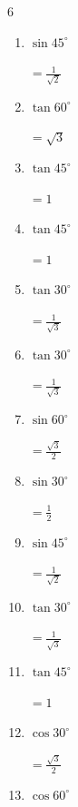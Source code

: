 \begin{multicols}{6}
\begin{enumerate}
        $\displaystyle =\frac{1}{\sqrt{3}}$

  \item $\displaystyle \sin{45^\circ}$

        $\displaystyle =\frac{1}{\sqrt{2}}$

  \item $\displaystyle \tan{60^\circ}$

        $\displaystyle =\sqrt{3}$

  \item $\displaystyle \tan{45^\circ}$

        $\displaystyle =1$

  \item $\displaystyle \tan{45^\circ}$

        $\displaystyle =1$

  \item $\displaystyle \tan{30^\circ}$

        $\displaystyle =\frac{1}{\sqrt{3}}$

  \item $\displaystyle \tan{30^\circ}$

        $\displaystyle =\frac{1}{\sqrt{3}}$

\columnbreak %

  \item $\displaystyle \sin{60^\circ}$

        $\displaystyle =\frac{\sqrt{3}}{2}$

  \item $\displaystyle \sin{30^\circ}$

        $\displaystyle =\frac{1}{2}$

  \item $\displaystyle \sin{45^\circ}$

        $\displaystyle =\frac{1}{\sqrt{2}}$

  \item $\displaystyle \tan{30^\circ}$

        $\displaystyle =\frac{1}{\sqrt{3}}$

  \item $\displaystyle \tan{45^\circ}$

        $\displaystyle =1$

  \item $\displaystyle \cos{30^\circ}$

        $\displaystyle =\frac{\sqrt{3}}{2}$

  \item $\displaystyle \cos{60^\circ}$


\end{enumerate}
\end{multicols}
